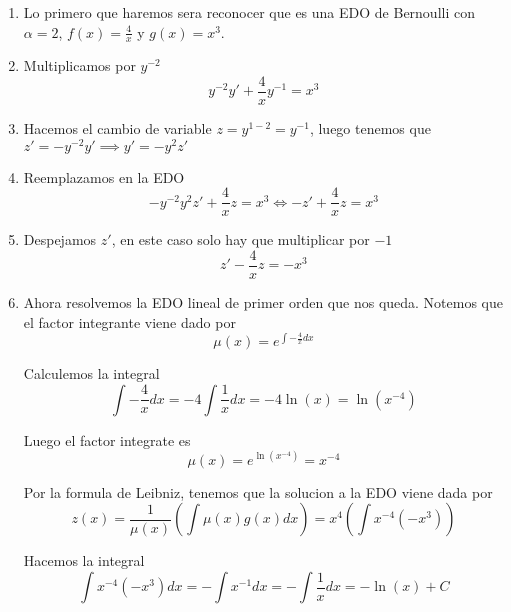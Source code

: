 \documentclass[a4paper,oneside,10.5pt]{article}
\begin{document}
\begin{enumerate}
  \item Lo primero que haremos sera reconocer que es una EDO de Bernoulli con $\alpha = 2$, $f(x) = \frac{4}{x}$ y $g(x) = x^{3}$.
  \item Multiplicamos por $y^{-2}$
        \begin{equation*}
          y^{-2}y' + \frac{4}{x}y^{-1} = x^{3}
        \end{equation*}
  \item Hacemos el cambio de variable $z = y^{1 - 2} = y^{-1}$, luego tenemos que $z' = -y^{-2}y' \implies y' = -y^{2}z'$
  \item Reemplazamos en la EDO
        \begin{equation*}
          -y^{-2}y^{2}z' + \frac{4}{x} z = x^{3} \iff -z' + \frac{4}{x} z = x^{3}
        \end{equation*}

  \item Despejamos $z'$, en este caso solo hay que multiplicar por $-1$
        \begin{equation*}
          z' - \frac{4}{x}z = -x^{3}
        \end{equation*}

  \item Ahora resolvemos la EDO lineal de primer orden que nos queda. Notemos que el factor integrante viene dado por
        \begin{equation*}
          \mu(x) = e^{\int -\frac{4}{x} dx}
        \end{equation*}

        Calculemos la integral
        \begin{equation*}
          \int - \frac{4}{x} dx = - 4 \int \frac{1}{x} dx = - 4 \ln(x) = \ln(x^{-4})
        \end{equation*}

        Luego el factor integrate es
        \begin{equation*}
          \mu(x) = e^{\ln(x^{-4})} = x^{-4}
        \end{equation*}

        Por la formula de Leibniz, tenemos que la solucion a la EDO viene dada por
        \begin{equation*}
          z(x) = \frac{1}{\mu(x)} (\int \mu(x) g(x) dx) = x^{4}(\int x^{-4}(-x^{3}))
        \end{equation*}

        Hacemos la integral
        \begin{equation*}
          \int x^{-4}(-x^{3}) dx = - \int x^{-1} dx = - \int \frac{1}{x} dx = - \ln (x) + C
        \end{equation*}


\end{enumerate}
\end{document}
